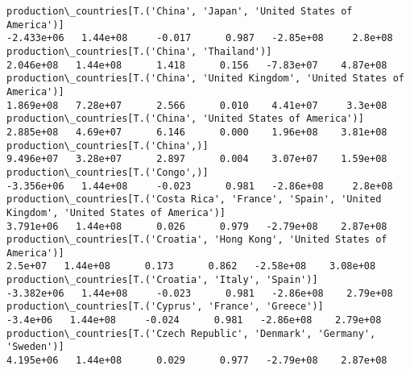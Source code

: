 \documentclass[11pt]{article}
\begin{document}
\begin{Verbatim}[commandchars=\\\{\}]
production\_countries[T.('China', 'Japan', 'United States of America')]                                                                                                                -2.433e+06   1.44e+08     -0.017      0.987   -2.85e+08     2.8e+08
production\_countries[T.('China', 'Thailand')]                                                                                                                                          2.046e+08   1.44e+08      1.418      0.156   -7.83e+07    4.87e+08
production\_countries[T.('China', 'United Kingdom', 'United States of America')]                                                                                                        1.869e+08   7.28e+07      2.566      0.010    4.41e+07     3.3e+08
production\_countries[T.('China', 'United States of America')]                                                                                                                          2.885e+08   4.69e+07      6.146      0.000    1.96e+08    3.81e+08
production\_countries[T.('China',)]                                                                                                                                                     9.496e+07   3.28e+07      2.897      0.004    3.07e+07    1.59e+08
production\_countries[T.('Congo',)]                                                                                                                                                    -3.356e+06   1.44e+08     -0.023      0.981   -2.86e+08     2.8e+08
production\_countries[T.('Costa Rica', 'France', 'Spain', 'United Kingdom', 'United States of America')]                                                                                3.791e+06   1.44e+08      0.026      0.979   -2.79e+08    2.87e+08
production\_countries[T.('Croatia', 'Hong Kong', 'United States of America')]                                                                                                             2.5e+07   1.44e+08      0.173      0.862   -2.58e+08    3.08e+08
production\_countries[T.('Croatia', 'Italy', 'Spain')]                                                                                                                                 -3.382e+06   1.44e+08     -0.023      0.981   -2.86e+08    2.79e+08
production\_countries[T.('Cyprus', 'France', 'Greece')]                                                                                                                                  -3.4e+06   1.44e+08     -0.024      0.981   -2.86e+08    2.79e+08
production\_countries[T.('Czech Republic', 'Denmark', 'Germany', 'Sweden')]                                                                                                             4.195e+06   1.44e+08      0.029      0.977   -2.79e+08    2.87e+08

\end{Verbatim}
\end{document}
